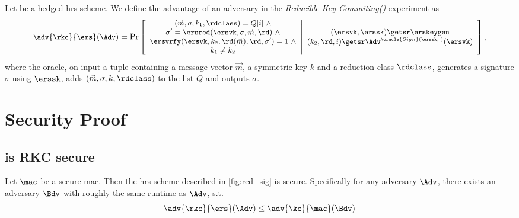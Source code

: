 \begin{definition}\label{def:rkc}
 Let \ers be a hedged \acl{hrs} scheme. We define the advantage of an adversary \Adv in the \emph{Reducible Key Commiting(\rkc)} experiment as
 \begin{equation*}\small
   \adv{\rkc}{\ers}(\Adv) = \Pr
   \left[
     \begin{array}{c}
       (\vec m,\sigma,k_1, \rdclass) = Q[i]\ \land \\
       \sigma' = \ersred(\ersvk, \sigma, \vec m, \rd)\ \land \\
       \ersvrfy(\ersvk, k_2, \rd(\vec m), \rd, \sigma') = 1\ \land \\
       k_1 \neq k_2
     \end{array}
     \middle\vert
     \begin{array}{c}
       (\ersvk, \erssk) \getsr \erskeygen\\
       (k_2, \rd, i) \getsr\Adv^{\oracle{Sign}(\erssk,\cdot)}(\ersvk)
     \end{array}
   \right],
 \end{equation*}
 where the  oracle, on input a tuple containing a message vector $\vec m$, a symmetric key $k$ and a reduction class $\rdclass$, generates a signature $\sigma$ using $\erssk$, adds $(\vec m, \sigma, k, \rdclass)$ to  the list $Q$ and outputs $\sigma$.
\end{definition}

\section{Security Proof}
\subsection{\ers is RKC secure}\label{sec:app-hrs-eo}
\begin{theorem}\label{thm:eo}
  Let $\mac$ be a \kc secure mac. Then the \acl{hrs} scheme described in \cref{fig:red_sig} is \rkc secure.
  Specifically for any adversary $\Adv$, there exists an adversary $\Bdv$ with roughly the same runtime as $\Adv$, s.t.
  \begin{equation*}
    \adv{\rkc}{\ers}({\Adv}) \leq \adv{\kc}{\mac}({\Bdv})
  \end{equation*}
\end{theorem}

